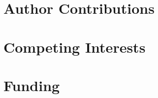 \documentclass[14pt, a4paper]{article}
\begin{document}
\section{Author Contributions}

\section{Competing Interests}

\section{Funding}


    


\end{document}
